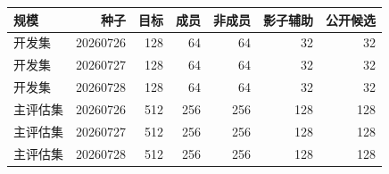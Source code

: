 \begin{tabular}{lrrrrrr}
\toprule
规模 & 种子 & 目标 & 成员 & 非成员 & 影子辅助 & 公开候选 \\
\midrule
开发集 & 20260726 & 128 & 64 & 64 & 32 & 32 \\
开发集 & 20260727 & 128 & 64 & 64 & 32 & 32 \\
开发集 & 20260728 & 128 & 64 & 64 & 32 & 32 \\
主评估集 & 20260726 & 512 & 256 & 256 & 128 & 128 \\
主评估集 & 20260727 & 512 & 256 & 256 & 128 & 128 \\
主评估集 & 20260728 & 512 & 256 & 256 & 128 & 128 \\
\bottomrule
\end{tabular}
